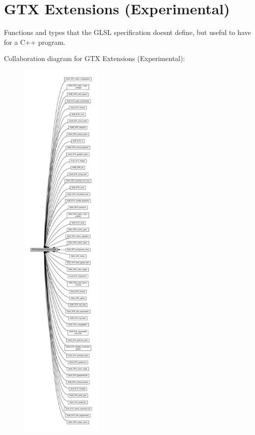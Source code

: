 \hypertarget{group__gtx}{}\section{G\+TX Extensions (Experimental)}
\label{group__gtx}


Functions and types that the G\+L\+SL specification doesn\textquotesingle{}t define, but useful to have for a C++ program.  


Collaboration diagram for G\+TX Extensions (Experimental)\+:\nopagebreak
\begin{figure}[H]
\begin{center}
\leavevmode
\includegraphics[height=550pt]{group__gtx}
\end{center}
\end{figure}
